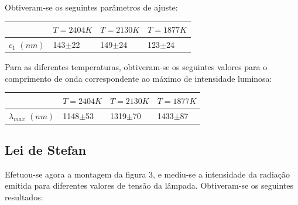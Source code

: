 \documentclass[9pt]{extarticle}
\begin{document}
\begin{multicols}{2}

\pagebreak

\par Obtiveram-se os seguintes parâmetros de ajuste:

{\small
\begin{center}
\begin{tabular}{ x{1.1cm} x{2cm} x{2cm} x{2cm} }
 & $T=2404K$ & $T=2130K$ & $T=1877K$ \tabularnewline
\hline \hline
$c_1$ $(nm)$ & 143$\pm$22 & 149$\pm$24 & 123$\pm$24 \tabularnewline
\end{tabular}
\par{}
\end{center}
}

\par Para as diferentes temperaturas, obtiveram-se os seguintes valores para o comprimento de onda correspondente ao máximo de intensidade luminosa:

{\small
\begin{center}
\begin{tabular}{ x{1.5cm} x{1.8cm} x{1.8cm} x{1.8cm} }
 & $T=2404K$ & $T=2130K$ & $T=1877K$ \tabularnewline
\hline \hline
$\lambda_{max}$ $(nm)$ & 1148$\pm$53 & 1319$\pm$70 & 1433$\pm$87 \tabularnewline
\end{tabular}
\par{}
\end{center}
}

\subsection{Lei de Stefan}

\par Efetuou-se agora a montagem da figura 3, e mediu-se a intensidade da radiação emitida para diferentes valores de tensão da lâmpada. Obtiveram-se os seguintes resultados:


\end{multicols}
\end{document}
